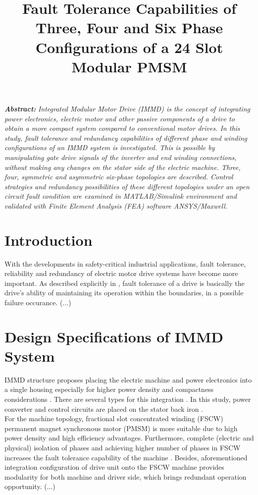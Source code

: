 \documentclass[a4paper,11pt]{article}
\title{\normalsize\textbf{Fault Tolerance Capabilities of Three, Four and Six Phase Configurations of a 24 Slot Modular PMSM}}
\date{}
\begin{document}
\vspace{-45mm}
\maketitle
\vspace{-23mm}
\textit{\normalsize\textbf{Abstract:}}
\textit{Integrated Modular Motor Drive (IMMD) is the concept of integrating power electronics, electric motor and other passive components of a drive to obtain a more compact system compared to conventional motor drives. In this study, fault tolerance and redundancy capabilities of different phase and winding configurations of an IMMD system is investigated. This is possible by manipulating gate drive signals of the inverter and end winding connections, without making any changes on the stator side of the electric machine. Three, four, symmetric and asymmetric six-phase topologies are described. Control strategies and redundancy possibilities of these different topologies under an open circuit fault condition are examined in MATLAB/Simulink environment and validated with Finite Element Analysis (FEA) software ANSYS/Maxwell. }

\section{\normalsize\textbf{Introduction}}
With the developments in safety-critical industrial applications, fault tolerance, reliability and redundancy of electric motor drive systems have become more important. As described explicitly in \cite{bible}, fault tolerance of a drive is basically the drive's ability of maintaining its operation within the boundaries, in a possible failure occurance. (...)

\section{\normalsize\textbf{Design Specifications of IMMD System}}
IMMD structure proposes placing the electric machine and power electronics into a single housing especially for higher power density and compactness considerations \cite{immd-bible}. There are several types for this integration \cite{difftopology1}\cite{difftopology2}. In this study, power converter and control circuits are placed on the stator back iron \cite{mesutto}. \\
For the machine topology, fractional slot concentrated winding (FSCW) permanent magnet synchronous motor (PMSM) is more suitable due to high power density and high efficiency advantages. Furthermore, complete (electric and physical) isolation of phases and achieving higher number of phases in FSCW increases the fault tolerance capability of the machine \cite{fscw}. Besides, aforementioned integration configuration of drive unit onto the FSCW machine provides modularity for both machine and driver side, which brings redundant operation opportunity. (...)
\end{document}
